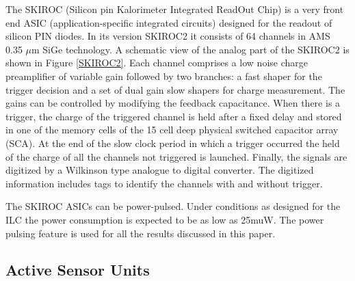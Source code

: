 \documentclass[a4paper,11pt]{article}
\begin{document}
The SKIROC\cite{Callier:2011zz} (Silicon pin Kalorimeter Integrated ReadOut Chip) is a
very front end ASIC (application-specific integrated circuits)
designed for the readout of silicon PIN diodes.
In its version SKIROC2 it consists of 64 channels in AMS 0.35 $\mu$m SiGe technology.
A schematic view of the analog part of the SKIROC2 is shown in Figure \ref{SKIROC2}.
Each channel comprises a low noise charge preamplifier of variable gain followed by two branches:
a fast shaper for the trigger decision and a set of dual gain slow shapers for charge measurement.
The gains can be controlled by modifying the feedback capacitance.
When there is a trigger, the charge of the triggered channel is held after a fixed delay 
and stored in one of the memory cells of the 15 cell deep physical switched capacitor array (SCA). 
At the end of the slow clock period in which a trigger occurred
the held of the charge of all the channels not triggered is launched.
Finally, the signals are digitized by a Wilkinson type analogue to digital converter.
The digitized information includes tags to identify the channels with and without trigger.


The SKIROC ASICs can be power-pulsed. 
Under conditions as designed for the ILC the power consumption is expected to be as low as 25muW.
The power pulsing feature is used for all the results discussed in this paper.



\subsection{Active Sensor Units}
\label{sec:ASU}
\end{document}
